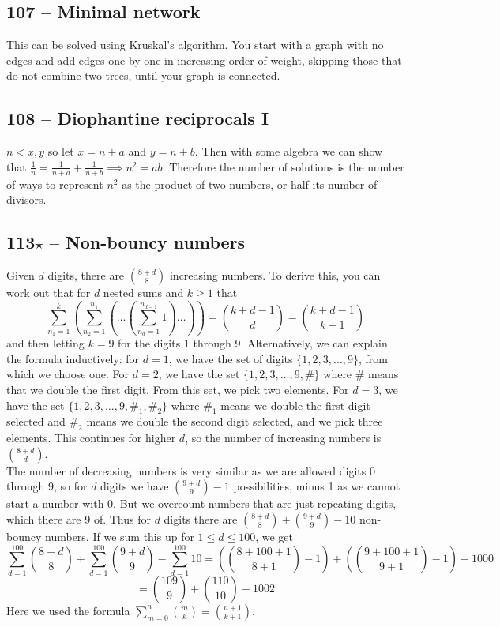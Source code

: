 \documentclass{article}
\begin{document}
\subsection*{107 -- Minimal network} 
This can be solved using Kruskal's algorithm. 
You start with a graph with no edges and add edges one-by-one in increasing order of weight, skipping those that do not combine two trees, until your graph is connected.

\subsection*{108 -- Diophantine reciprocals I} 
$n < x, y$ so let $x = n+a$ and $y = n+b$. 
Then with some algebra we can show that $\frac{1}{n} = \frac{1}{n+a} + \frac{1}{n+b} \implies n^2 = ab$. 
Therefore the number of solutions is the number of ways to represent $n^2$ as the product of two numbers, or half its number of divisors.

\subsection*{113$\star$ -- Non-bouncy numbers} 
Given $d$ digits, there are $\binom{8+d}{8}$ increasing numbers. 
To derive this, you can work out that for $d$ nested sums and $k \geq 1$ that
$$\sum_{n_1=1}^k \left( \sum_{n_2=1}^{n_1} \left( \dotso \left(\sum_{n_d=1}^{n_{d-1}} 1\right) \dotso \right) \right) = \binom{k+d-1}{d} = \binom{k+d-1}{k-1}$$
and then letting $k=9$ for the digits 1 through 9. 
Alternatively, we can explain the formula inductively: for $d=1$, we have the set of digits $\{1, 2, 3, \dotsc, 9\}$, from which we choose one. 
For $d=2$, we have the set $\{1, 2, 3, \dotsc, 9, \#\}$ where $\#$ means that we double the first digit.
From this set, we pick two elements. 
For $d=3$, we have the set $\{1, 2, 3, \dotsc, 9, \#_1, \#_2\}$ where $\#_1$ means we double the first digit selected and $\#_2$ means we double the second digit selected, and we pick three elements.
This continues for higher $d$, so the number of increasing numbers is $\binom{8+d}{d}$.\\

The number of decreasing numbers is very similar as we are allowed digits 0 through 9, so for $d$ digits we have $\binom{9+d}{9}-1$ possibilities, minus 1 as we cannot start a number with 0. 
But we overcount numbers that are just repeating digits, which there are 9 of.
Thus for $d$ digits there are $\binom{8+d}{8} + \binom{9+d}{9} - 10$ non-bouncy numbers. 
If we sum this up for $1 \leq d \leq 100$, we get 
$$ \sum_{d=1}^{100} \binom{8+d}{8} + \sum_{d=1}^{100} \binom{9+d}{9} - \sum_{d=1}^{100} 10 = \left( \binom{8+100+1}{8+1} - 1 \right) + \left( \binom{9+100+1}{9+1} - 1 \right) - 1000 $$
$$ = \boxed{ \binom{109}{9} + \binom{110}{10} - 1002 }$$
Here we used the formula $\sum\limits_{m=0}^n \binom{m}{k} = \binom{n+1}{k+1}$.
\end{document}
